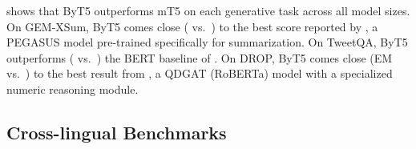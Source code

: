 \documentclass[11pt,a4paper]{article}
\begin{document}
\begin{table}[t!]
\centering
{}
\caption{mT5 vs.~ByT5 on three English generation tasks, reporting the best score on the validation set.}
\label{tab:english_generation}
\end{table} 
 shows that ByT5 outperforms mT5 on each generative task across all model sizes. On \mbox{GEM-XSum}, ByT5 comes close ( vs.~) to the best score reported by \citet{gehrmann2021gem}, a PEGASUS model \cite{zhang-2020-pegasus} pre-trained specifically for summarization. On TweetQA, ByT5 outperforms ( vs.~) the BERT baseline of \citet{xiong-etal-2019-tweetqa}. On DROP, ByT5 comes close (EM  vs.~) to the best result from \citet{chen2020question}, a QDGAT (RoBERTa) model with a specialized numeric reasoning module.

\subsection{Cross-lingual Benchmarks}
\end{document}
